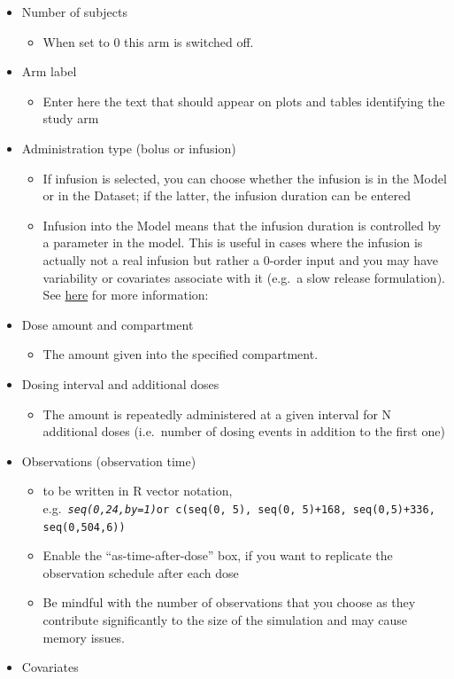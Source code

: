 \documentclass[
]{book}
\providecommand{\tightlist}{%
  \setlength{\itemsep}{0pt}\setlength{\parskip}{0pt}}
\begin{document}
\begin{itemize}
\tightlist
\item
  Number of subjects

  \begin{itemize}
  \tightlist
  \item
    When set to 0 this arm is switched off.
  \end{itemize}
\item
  Arm label

  \begin{itemize}
  \tightlist
  \item
    Enter here the text that should appear on plots and tables identifying the study arm
  \end{itemize}
\item
  Administration type (bolus or infusion)

  \begin{itemize}
  \tightlist
  \item
    If infusion is selected, you can choose whether the infusion is in the Model or in the Dataset; if the latter, the infusion duration can be entered
  \item
    Infusion into the Model means that the infusion duration is controlled by a parameter in the model. This is useful in cases where the infusion is actually not a real infusion but rather a 0-order input and you may have variability or covariates associate with it (e.g.~a slow release formulation). See \href{https://calvagone.github.io/campsis.doc/articles/v06_infusions.html}{here} for more information:
  \end{itemize}
\item
  Dose amount and compartment

  \begin{itemize}
  \tightlist
  \item
    The amount given into the specified compartment.
  \end{itemize}
\item
  Dosing interval and additional doses

  \begin{itemize}
  \tightlist
  \item
    The amount is repeatedly administered at a given interval for N additional doses (i.e.~number of dosing events in addition to the first one)
  \end{itemize}
\item
  Observations (observation time)

  \begin{itemize}
  \tightlist
  \item
    to be written in R vector notation, e.g.~\emph{\texttt{seq(0,24,by=1)}}\texttt{or\ c(seq(0,\ 5),\ seq(0,\ 5)+168,\ seq(0,5)+336,\ seq(0,504,6))}
  \item
    Enable the ``as-time-after-dose'' box, if you want to replicate the observation schedule after each dose
  \item
    Be mindful with the number of observations that you choose as they contribute significantly to the size of the simulation and may cause memory issues.
  \end{itemize}
\item
  Covariates


\end{itemize}
\end{document}
